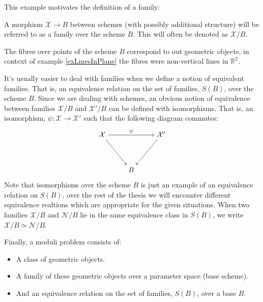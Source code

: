 This example motivates the definition of a family: 
\begin{definition}
    A morphism $\mathcal{X} \to B$ between schemes (with possibly additional structure) will be referred to as a family over the scheme $B$. This will often be denoted as $\mathcal{X}/B$.
\end{definition}
The fibres over points of the scheme $B$ correspond to out geometric objects, in context of example \ref{exLinesInPlane} the fibres were non-vertical lines in $\mathbb{R}^{2}$.
\par It's usually easier to deal with families when we define a notion of equivalent families. 
That is, an equivalence relation on the set of families, $S(B)$, over the scheme $B$. 
Since we are dealing with schemes, an obvious notion of equivalence between families $\mathcal{X}/B$ and $\mathcal{X}'/B$ can be defined with isomorphisms. That is, an isomorphism, $\psi: \mathcal{X} \to \mathcal{X}'$ such that the following diagram commutes:
\[
\begin{tikzcd}
    {\mathcal{X}} && {\mathcal{X}'}\\
    \\
                  & {B} 
     \arrow["\psi", from = 1-1, to = 1-3]
     \arrow[from = 1-1, to = 3-2]
     \arrow[from = 1-3, to = 3-2]
\end{tikzcd}
\]
Note that isomorphisms over the scheme $B$ is just an example of an equivalence relation on $S(B)$, over the rest of the thesis we will encounter different equivalence realtions which are appropriate for the given situations.
When two families $\mathcal{X}/B$ and $\mathcal{N}/B$ lie in the same equivalence class in $S(B)$, we write $\mathcal{X}/B \simeq \mathcal{N}/B$.
\par Finally, a moduli problem consists of:
\begin{itemize}
    \item A class of geometric objects.
    \item A family of these geometric objects over a parameter space (base scheme).
    \item And an equivalence relation on the set of families, $S(B)$, over a base $B$.
\end{itemize}

